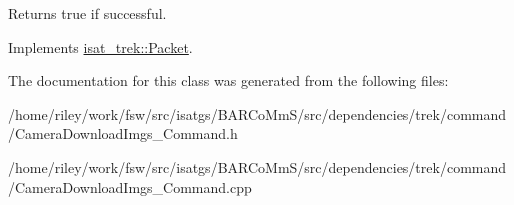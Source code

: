 \begin{DoxyReturn}{Returns}
true if successful. 
\end{DoxyReturn}


Implements \hyperlink{classisat__trek_1_1_packet}{isat\+\_\+trek\+::\+Packet}.



The documentation for this class was generated from the following files\+:\begin{DoxyCompactItemize}
\item 
/home/riley/work/fsw/src/isatgs/\+B\+A\+R\+Co\+Mm\+S/src/dependencies/trek/command/Camera\+Download\+Imgs\+\_\+\+Command.\+h\item 
/home/riley/work/fsw/src/isatgs/\+B\+A\+R\+Co\+Mm\+S/src/dependencies/trek/command/Camera\+Download\+Imgs\+\_\+\+Command.\+cpp\end{DoxyCompactItemize}
